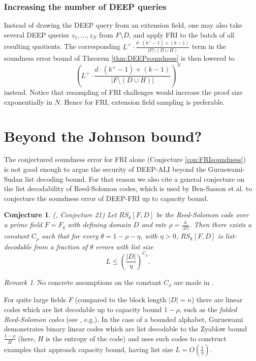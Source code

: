 \documentclass[11pt,article,oneside]{memoir}
\newtheorem{conj}[]{Conjecture}
\theoremstyle{definition}
\theoremstyle{remark}
\newtheorem{rem}[thm]{Remark}
\begin{document}
\subsubsection{Increasing the number of DEEP queries}
Instead of drawing the DEEP query from an extension field, one may also take several DEEP queries $z_1,\ldots , z_N$ from $F\setminus D$, and apply FRI to the batch of all resulting quotients. 
The corresponding $L^+\cdot\frac{d\cdot (k^+-1)+ (k -1)}{|F|\setminus (D\cup H)}$ term in the soundness error bound of Theorem \ref{thm:DEEPsoundness} is then lowered to  
\[
\left(L^+\cdot\frac{d\cdot (k^+ - 1) + (k - 1)}{|F\setminus (D\cup H)|}\right)^N
\]
instead. 
Notice that resampling of FRI challenges would increase the proof size exponentially in $N$. 
Hence for  FRI, extension field sampling is preferable.  

\section{Beyond the Johnson bound?}
\label{s:RSConjecture}

The conjectured soundness error for FRI alone (Conjecture \ref{con:FRIsoundness}) is not good enough to argue the security of DEEP-ALI beyond the Guruswami-Sudan list decoding bound. 
For that reason we also cite a general conjecture on the list decodability of Reed-Solomon codes, which is used by Ben-Sasson et al. to conjecture the soundness error of DEEP-FRI up to capacity bound. 

\begin{conj}
(\cite{DEEPFRI}, Conjecture 21) 
Let $RS_k[F,D]$ be the Reed-Solomon code over a prime field $F=F_q$ with defining domain $D$ and rate $\rho=\frac{k}{|D|}$. 
Then there exists a constant $C_\rho$  such that for every $\theta =1-\rho -\eta$, with $\eta>0$, $RS_k[F,D]$ is list-decodable from a fraction of $\theta$ errors with list size
\[
L \leq\left(\frac{|D|}{\eta}\right)^{C_\rho}.
\]
\end{conj}
\begin{rem}
No concrete assumptions on the constant $C_\rho$ are made in \cite{DEEPFRI}.
\end{rem}

For quite large fields $F$ (compared to the block length $|D|=n$) there are linear codes which are list decodable up to capacity bound $1-\rho$, such as the \textit{folded Reed-Solomon codes} (see \cite{ListDecodingBook}, e.g.). 
In the case of a bounded alphabet, Guruswami \cite{ListDecodingBook} demonstrates binary linear codes which are list decodable to the Zyablow bound $\frac{1-\rho}{H}$ (here, $H$ is the entropy of the code) and uses such codes to construct examples that approach capacity bound, having list size $L=O\left(\frac{1}{\eta}\right)$. 
\end{document}
